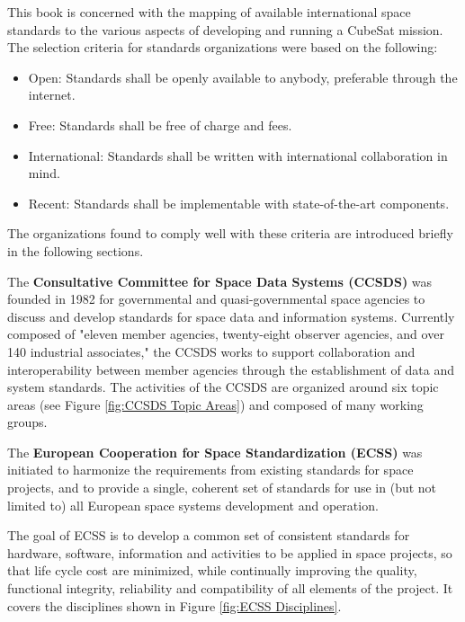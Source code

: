 This book is concerned with the mapping of available international space standards to the various aspects of developing and running a CubeSat mission. The selection criteria for standards organizations were based on the following:

\begin{itemize}
\item Open: Standards shall be openly available to anybody, preferable through the internet.
\item Free: Standards shall be free of charge and fees.
\item International: Standards shall be written with international collaboration in mind.
\item Recent: Standards shall be implementable with state-of-the-art components.
\end{itemize}

The organizations found to comply well with these criteria are introduced briefly in the following sections.

The \textbf{Consultative Committee for Space Data Systems (CCSDS)} \cite{ccsds.org} was founded in 1982 for governmental and quasi-governmental space agencies to discuss and develop standards for space data and information systems. Currently composed of "eleven member agencies, twenty-eight observer agencies, and over 140 industrial associates," the CCSDS works to support collaboration and interoperability between member agencies through the establishment of data and system standards. The activities of the CCSDS are organized around six topic areas (see Figure \ref{fig:CCSDS Topic Areas}) and composed of many working groups.

The \textbf{European Cooperation for Space Standardization (ECSS)} \cite{ecss.nl} was initiated to harmonize the requirements from existing standards for space projects, and to provide a single, coherent set of standards for use in (but not limited to) all European space systems development and operation.

The goal of ECSS is to develop a common set of consistent standards for hardware, software, information and activities to be applied in space projects, so that life cycle cost are minimized, while continually improving the quality, functional integrity, reliability and compatibility of all elements of the project. It covers the disciplines shown in Figure \ref{fig:ECSS Disciplines}. 

